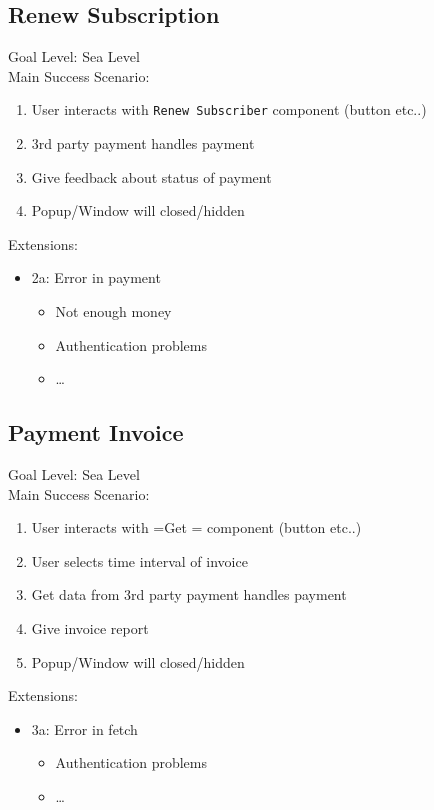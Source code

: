 \documentclass[11pt]{article}
\begin{document}
\subsection{Renew Subscription}
\label{sec:orgbe33845}
Goal Level: Sea Level \\
Main Success Scenario: 

\begin{enumerate}
\item User interacts with \texttt{Renew Subscriber} component (button etc..)
\item 3rd party payment handles payment
\item Give feedback about status of payment
\item Popup/Window will closed/hidden
\end{enumerate}

Extensions:
\begin{itemize}
\item 2a: Error in payment
\begin{itemize}
\item Not enough money
\item Authentication problems
\item \ldots{}
\end{itemize}
\end{itemize}
\subsection{Payment Invoice}
\label{sec:org0d16b77}
Goal Level: Sea Level \\
Main Success Scenario: \\

\begin{enumerate}
\item User interacts with =Get = component (button etc..)
\item User selects time interval of invoice
\item Get data from 3rd party payment handles payment
\item Give invoice report
\item Popup/Window will closed/hidden
\end{enumerate}

Extensions:  \\
\begin{itemize}
\item 3a: Error in fetch
\begin{itemize}
\item Authentication problems
\item \ldots{}
\end{itemize}
\end{itemize}
\end{document}
